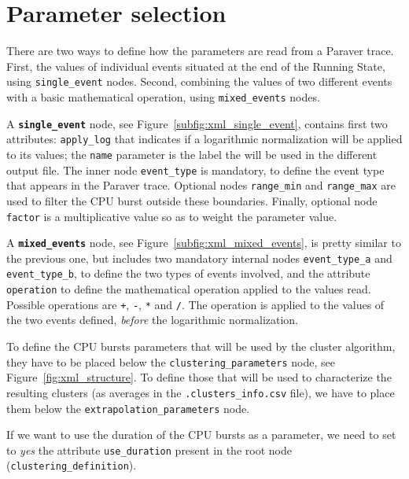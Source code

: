 \documentclass[twoside,a4,english,11pt]{book}
\begin{document}
\section{Parameter selection}

There are two ways to define how the parameters are read from a Paraver trace.
First, the values of individual events situated at the end of the Running 
State, using \texttt{single\_event} nodes. Second, combining the values of
two different events with a basic mathematical operation, using 
\texttt{mixed\_events} nodes.

A \textbf{\texttt{single\_event}} node, see Figure~\ref{subfig:xml_single_event},
contains first two attributes: \texttt{apply\_log} that indicates if
a logarithmic normalization will be applied to its values; the \texttt{name}
parameter is the label the will be used in the different output file. 
The inner node \texttt{event\_type} is mandatory, to define the event type 
that appears in the Paraver trace. Optional nodes \texttt{range\_min} and 
\texttt{range\_max} are used to filter the CPU burst outside these 
boundaries. Finally, optional node \texttt{factor} is a multiplicative
value so as to weight the parameter value.

A \textbf{\texttt{mixed\_events}} node, see Figure~\ref{subfig:xml_mixed_events},
is pretty similar to the previous one, but includes two mandatory internal
nodes \texttt{event\_type\_a} and \texttt{event\_type\_b}, to define the
two types of events involved, and the attribute \texttt{operation} to define
the mathematical operation applied to the values read. Possible operations
are \texttt{+}, \texttt{-}, \texttt{*} and \texttt{/}. The operation is 
applied to the values of the two events defined, \textit{before} the 
logarithmic normalization.

To define the CPU bursts parameters that will be used by the cluster algorithm,
they have to be placed below the \texttt{clustering\_parameters} node,
see Figure~\ref{fig:xml_structure}. To define those that will be used to
characterize the resulting clusters (as averages in the \texttt{.clusters\_info.csv}
file), we have to place them below the \texttt{extrapolation\_parameters} node.

If we want to use the duration of the CPU bursts as a parameter, we need to 
set to \textit{yes} the attribute \texttt{use\_duration} present in the root
node (\texttt{cluste\-ring\_definition}).

\end{document}
